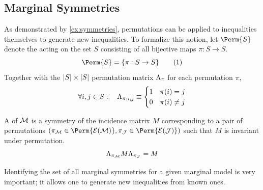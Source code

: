 \documentclass[aps, 10pt, english, twoside, pra, nofootinbib, longbibliography]{revtex4-1}
\begin{document}
    \subsection{Marginal Symmetries}
    As demonstrated by \cref{ex:symmetries}, permutations can be applied to inequalities themselves to generate new inequalities. To formalize this notion, let $\Perm{S}$ denote the  acting on the set $S$ consisting of all bijective maps $\pi : S \to S$.
    \[ \Perm{S} = \bc{\pi : S \to S} \eq \label{eq:permutation_group_def}\]
    Together with the $\abs{S}\times\abs{S}$ permutation matrix $\Lambda_{\pi}$ for each permutation $\pi$,
    \[ \forall i,j \in S : \quad {\PermM{\pi}}_{;i,j} \defined \begin{cases}
        1 & \pi\br{i} = j\\
        0 & \pi\br{i} \neq j\\
    \end{cases} \]

    \begin{definition}
        A  of $\mathcal{M}$ is a symmetry of the incidence matrix $M$ corresponding to a pair of permutations $\br{\pi_\mscenario \in \Perm{\Events{\mscenario}}, \pi_\jointvar\in \Perm{\Events{\jointvar}}}$ such that $M$ is invariant under permutation.
        \[ \Lambda_{\pi_{\mathcal{M}}}  M  \Lambda_{\pi_{\mathcal{J}}} = M \]
    \end{definition}

    Identifying the set of all marginal symmetries for a given marginal model is very important; it allows one to generate new inequalities from known ones.
\end{document}
